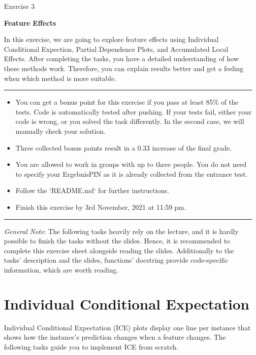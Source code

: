\documentclass[a4paper]{article}
\begin{document}
{\noindent\LARGE Exercise 3\par}
\vspace{8pt}
{\noindent\huge\textbf{Feature Effects}}
\vspace{20pt}

\noindent
In this exercise, we are going to explore feature effects using Individual Conditional Expection, Partial Dependence Plots, and Accumulated Local Effects. After completing the tasks, you have a detailed understanding of how these methods work. Therefore, you can explain results better and get a feeling when which method is more suitable.

\vspace{10pt}
\par\noindent\rule{\textwidth}{0.2pt}
\begin{itemize}
    \item You can get a bonus point for this exercise if you pass at least 85\% of the tests. Code is automatically tested after pushing. If your tests fail, either your code is wrong, or you solved the task differently. In the second case, we will manually check your solution.
    \item Three collected bonus points result in a 0.33 increase of the final grade.
    \item You are allowed to work in groups with up to three people. You do not need to specify your ErgebnisPIN as it is already collected from the entrance test.
    \item Follow the `README.md` for further instructions.
    \item Finish this exercise by 3rd November, 2021 at 11:59 pm.
\end{itemize}
\par\noindent\rule{\textwidth}{0.2pt}
\vspace{8pt}

\noindent \textit{General Note}: The following tasks heavily rely on the lecture, and it is hardly possible to finish the tasks without the slides. Hence, it is recommended to complete this exercise sheet alongside reading the slides. Additionally to the tasks' description and the slides, functions' docstring provide code-specific information, which are worth reading.


\section{Individual Conditional Expectation}

Individual Conditional Expectation (ICE) plots display one line per instance that shows how the instance’s prediction changes when a feature changes. The following tasks guide you to implement ICE from scratch.\\
\end{document}
